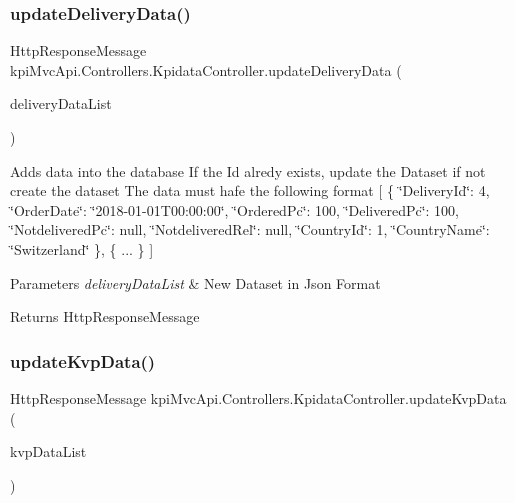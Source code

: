 \subsubsection{\texorpdfstring{update\+Delivery\+Data()}{updateDeliveryData()}}
{\footnotesize\ttfamily Http\+Response\+Message kpi\+Mvc\+Api.\+Controllers.\+Kpidata\+Controller.\+update\+Delivery\+Data (\begin{DoxyParamCaption}\item[{List$<$ \hyperlink{classkpi_mvc_api_1_1_data_transfer_objects_1_1_delivery_data_dto}{Delivery\+Data\+Dto} $>$}]{delivery\+Data\+List }\end{DoxyParamCaption})\hspace{0.3cm}{\ttfamily [inline]}}



Adds data into the database If the Id alredy exists, update the Dataset if not create the dataset The data must hafe the following format \mbox{[} \{ \char`\"{}\+Delivery\+Id\char`\"{}\+: 4, \char`\"{}\+Order\+Date\char`\"{}\+: \char`\"{}2018-\/01-\/01\+T00\+:00\+:00\char`\"{}, \char`\"{}\+Ordered\+Pc\char`\"{}\+: 100, \char`\"{}\+Delivered\+Pc\char`\"{}\+: 100, \char`\"{}\+Notdelivered\+Pc\char`\"{}\+: null, \char`\"{}\+Notdelivered\+Rel\char`\"{}\+: null, \char`\"{}\+Country\+Id\char`\"{}\+: 1, \char`\"{}\+Country\+Name\char`\"{}\+: \char`\"{}\+Switzerland\char`\"{} \}, \{ ... \} \mbox{]} 


\begin{DoxyParams}{Parameters}
{\em delivery\+Data\+List} & New Dataset in Json Format \\
\hline
\end{DoxyParams}
\begin{DoxyReturn}{Returns}
{\ttfamily Http\+Response\+Message} 
\end{DoxyReturn}
\mbox{\label{classkpi_mvc_api_1_1_controllers_1_1_kpidata_controller_ac165b3dedfa1744a41af6a1acc07a657}} 
\subsubsection{\texorpdfstring{update\+Kvp\+Data()}{updateKvpData()}}
{\footnotesize\ttfamily Http\+Response\+Message kpi\+Mvc\+Api.\+Controllers.\+Kpidata\+Controller.\+update\+Kvp\+Data (\begin{DoxyParamCaption}\item[{List$<$ \hyperlink{classkpi_mvc_api_1_1_data_transfer_objects_1_1_kvp_data_dto}{Kvp\+Data\+Dto} $>$}]{kvp\+Data\+List }\end{DoxyParamCaption})\hspace{0.3cm}{\ttfamily [inline]}}



